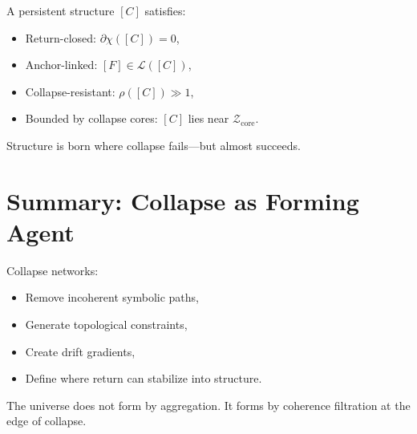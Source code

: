 A persistent structure $[C]$ satisfies:
\begin{itemize}
  \item Return-closed: $\partial\chi([C]) = 0$,
  \item Anchor-linked: $[F] \in \mathcal{L}([C])$,
  \item Collapse-resistant: $\rho([C]) \gg 1$,
  \item Bounded by collapse cores: $[C]$ lies near $\mathcal{Z}_{\text{core}}$.
\end{itemize}

Structure is born where collapse fails—but almost succeeds.

\section{Summary: Collapse as Forming Agent} \label{sec:collapse-summary}

Collapse networks:
\begin{itemize}
  \item Remove incoherent symbolic paths,
  \item Generate topological constraints,
  \item Create drift gradients,
  \item Define where return can stabilize into structure.
\end{itemize}

The universe does not form by aggregation. It forms by coherence filtration at the edge of collapse.

